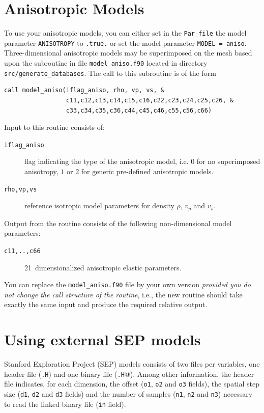 \section{Anisotropic Models}\label{sec:Anisotropic-Models}

To use your anisotropic models, you can either set in the \texttt{Par\_file}
the model parameter \texttt{ANISOTROPY} to \texttt{.true.} or set
the model parameter \texttt{MODEL = aniso}. Three-dimensional anisotropic
models may be superimposed on the mesh based upon the subroutine in
file \texttt{model\_aniso.f90} located in directory \texttt{src/generate\_databases}.
The call to this subroutine is of the form
\begin{verbatim}
call model_aniso(iflag_aniso, rho, vp, vs, &
                 c11,c12,c13,c14,c15,c16,c22,c23,c24,c25,c26, &
                 c33,c34,c35,c36,c44,c45,c46,c55,c56,c66)
\end{verbatim}
Input to this routine consists of:
\begin{description}
\item [{\texttt{iflag\_aniso}}] flag indicating the type of the anisotropic
model, i.e. $0$ for no superimposed anisotropy, $1$ or $2$ for
generic pre-defined anisotropic models.
\item [{\texttt{rho,vp,vs}}] reference isotropic model parameters for density
$\rho$, $v_{p}$ and $v_{s}$.
\end{description}
Output from the routine consists of the following non-dimensional
model parameters:
\begin{description}
\item [{\texttt{c11,..,c66}}] 21~dimensionalized
anisotropic elastic parameters.
\end{description}
You can replace the \texttt{model\_aniso.f90} file by your own version
\textit{provided you do not change the call structure of the routine},
i.e., the new routine should take exactly the same input and produce
the required relative output.



\section{Using external SEP models}\label{sec:Using-SEP}

Stanford Exploration Project (SEP) models consists of two files per variables, one header file (\texttt{.H})
and one binary file (\texttt{.H$@$}).
Among other information, the header file indicates, for each dimension,
the offset (\texttt{o1}, \texttt{o2} and \texttt{o3} fields),
the spatial step size (\texttt{d1}, \texttt{d2} and \texttt{d3} fields)
and the number of samples (\texttt{n1}, \texttt{n2} and \texttt{n3}) necessary to read
the linked binary file (\texttt{in} field).

